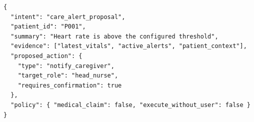 \begin{lstlisting}[caption={ตัวอย่าง action candidate ที่ต้องผ่าน execution gate},label={lst:app_ai_action_candidate}]
{
  "intent": "care_alert_proposal",
  "patient_id": "P001",
  "summary": "Heart rate is above the configured threshold",
  "evidence": ["latest_vitals", "active_alerts", "patient_context"],
  "proposed_action": {
    "type": "notify_caregiver",
    "target_role": "head_nurse",
    "requires_confirmation": true
  },
  "policy": { "medical_claim": false, "execute_without_user": false }
}
\end{lstlisting}
